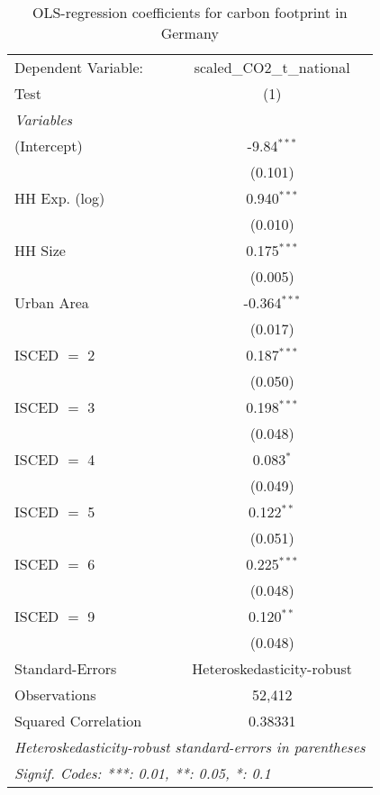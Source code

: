 
\begin{table}[htbp!]
   \centering
   \small
   \begin{adjustbox}{width = 1\textwidth, max height = 0.95\textheight, center}
      \begin{threeparttable}[b]
         \caption{\label{tab:OLS_2_DEU} OLS-regression coefficients for carbon footprint in Germany}
         \begin{tabular}{lc}
            \tabularnewline \midrule \midrule
            Dependent Variable: & scaled\_CO2\_t\_national\\     
            Test                & (1)\\  
            \midrule
            \emph{Variables}\\
            (Intercept)         & -9.84$^{***}$\\   
                                & (0.101)\\   
            HH Exp. (log)       & 0.940$^{***}$\\   
                                & (0.010)\\   
            HH Size             & 0.175$^{***}$\\   
                                & (0.005)\\   
            Urban Area          & -0.364$^{***}$\\   
                                & (0.017)\\   
            ISCED $=$ 2         & 0.187$^{***}$\\   
                                & (0.050)\\   
            ISCED $=$ 3         & 0.198$^{***}$\\   
                                & (0.048)\\   
            ISCED $=$ 4         & 0.083$^{*}$\\   
                                & (0.049)\\   
            ISCED $=$ 5         & 0.122$^{**}$\\   
                                & (0.051)\\   
            ISCED $=$ 6         & 0.225$^{***}$\\   
                                & (0.048)\\   
            ISCED $=$ 9         & 0.120$^{**}$\\   
                                & (0.048)\\   
            \midrule 
            Standard-Errors     & Heteroskedasticity-robust \\   
            Observations        & 52,412\\  
            Squared Correlation & 0.38331\\  
            \midrule \midrule
            \multicolumn{2}{l}{\emph{Heteroskedasticity-robust standard-errors in parentheses}}\\
            \multicolumn{2}{l}{\emph{Signif. Codes: ***: 0.01, **: 0.05, *: 0.1}}\\
         \end{tabular}
         

\end{threeparttable}
\end{adjustbox}
\end{table}
